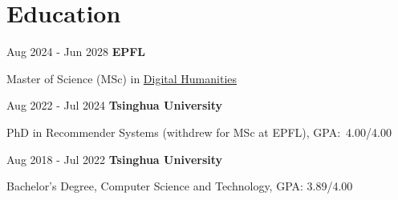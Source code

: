 \section{Education}

        
        
        \begin{twocolentry}{
            Aug 2024 - Jun 2028
        }
        \textbf{EPFL}
        

        Master of Science (MSc) in \href{https://www.epfl.ch/education/master/programs/digital-humanities/}{Digital Humanities}\end{twocolentry}

        \vspace{0.10 cm}
        
        \begin{twocolentry}{
            Aug 2022 - Jul 2024
        }
        \textbf{Tsinghua University}
        
        PhD in Recommender Systems (withdrew for MSc at EPFL), GPA:~4.00/4.00
        \end{twocolentry}
        \vspace{0.10 cm}

        \begin{twocolentry}{
            Aug 2018 - Jul 2022
        }
        \textbf{Tsinghua University}
        
        Bachelor's Degree, Computer Science and Technology, GPA: 3.89/4.00
        \end{twocolentry}
        

